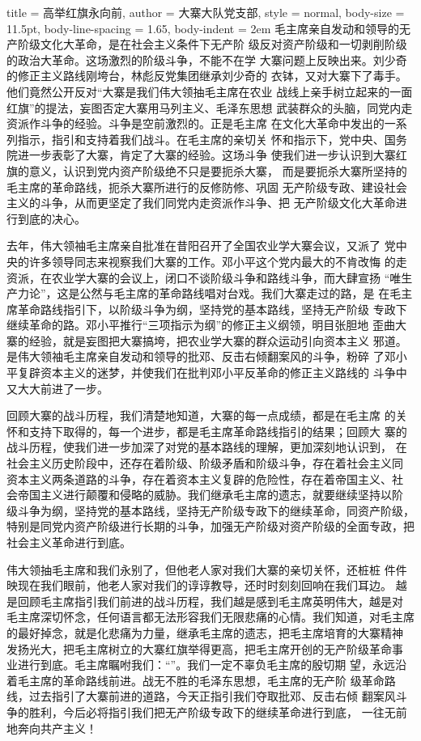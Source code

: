 \begin{hongqiarticle}{
        title  = {高举红旗永向前},
        author = {大寨大队党支部},
        style  = normal,
        body-size = 11.5pt,
        body-line-spacing = 1.65,
        body-indent = 2em
    }
    毛主席亲自发动和领导的无产阶级文化大革命，是在社会主义条件下无产阶
    级反对资产阶级和一切剥削阶级的政治大革命。这场激烈的阶级斗争，不能不在学
    大寨问题上反映出来。刘少奇的修正主义路线刚垮台，林彪反党集团继承刘少奇的
    衣钵，又对大寨下了毒手。他们竟然公开反对“大寨是我们伟大领抽毛主席在农业
    战线上亲手树立起来的一面红旗”的提法，妄图否定大寨用马列主义、毛泽东思想
    武装群众的头脑，同党内走资派作斗争的经验。斗争是空前激烈的。正是毛主席
    在文化大革命中发出的一系列指示，指引和支持着我们战斗。在毛主席的亲切关
    怀和指示下，党中央、国务院进一步表彰了大寨，肯定了大寨的经验。这场斗争
    使我们进一步认识到大寨红旗的意义，认识到党内资产阶级绝不只是要扼杀大寨，
    而是要扼杀大寨所坚持的毛主席的革命路线，扼杀大寨所进行的反修防修、巩固
    无产阶级专政、建设社会主义的斗争，从而更坚定了我们同党内走资派作斗争、把
    无产阶级文化大革命进行到底的决心。
    
    去年，伟大领袖毛主席亲自批准在昔阳召开了全国农业学大寨会议，又派了
    党中央的许多领导同志来视察我们大寨的工作。邓小平这个党内最大的不肯改悔
    的走资派，在农业学大寨的会议上，闭口不谈阶级斗争和路线斗争，而大肆宣扬
    “唯生产力论”，这是公然与毛主席的革命路线唱对台戏。我们大寨走过的路，是
    在毛主席革命路线指引下，以阶级斗争为纲，坚持党的基本路线，坚持无产阶级
    专政下继续革命的路。邓小平推行“三项指示为纲”的修正主义纲领，明目张胆地
    歪曲大寨的经验，就是妄图把大寨搞垮，把农业学大寨的群众运动引向资本主义
    邪道。是伟大领袖毛主席亲自发动和领导的批邓、反击右倾翻案风的斗争，粉碎
    了邓小平复辟资本主义的迷梦，并使我们在批判邓小平反革命的修正主义路线的
    斗争中又大大前进了一步。
    
    回顾大寨的战斗历程，我们清楚地知道，大寨的每一点成绩，都是在毛主席
    的关怀和支持下取得的，每一个进步，都是毛主席革命路线指引的结果；回顾大
    寨的战斗历程，使我们进一步加深了对党的基本路线的理解，更加深刻地认识到，
    在社会主义历史阶段中，还存在着阶级、阶级矛盾和阶级斗争，存在着社会主义同
    资本主义两条道路的斗争，存在着资本主义复辟的危险性，存在着帝国主义、社
    会帝国主义进行颠覆和侵略的威胁。我们继承毛主席的遗志，就要继续坚持以阶
    级斗争为纲，坚持党的基本路线，坚持无产阶级专政下的继续革命，同资产阶级，
    特别是同党内资产阶级进行长期的斗争，加强无产阶级对资产阶级的全面专政，把
    社会主义革命进行到底。
    
    伟大领抽毛主席和我们永别了，但他老人家对我们大寨的亲切关怀，还桩桩
    件件映现在我们眼前，他老人家对我们的谆谆教导，还时时刻刻回响在我们耳边。
    越是回顾毛主席指引我们前进的战斗历程，我们越是感到毛主席英明伟大，越是对
    毛主席深切怀念，任何语言都无法形容我们无限悲痛的心情。我们知道，对毛主席
    的最好掉念，就是化悲痛为力量，继承毛主席的遗志，把毛主席培育的大寨精神
    发扬光大，把毛主席树立的大寨红旗举得更高，把毛主席开创的无产阶级革命事
    业进行到底。毛主席瞩咐我们：“”。我们一定不辜负毛主席的殷切期
    望，永远沿着毛主席的革命路线前进。战无不胜的毛泽东思想，毛主席的无产阶
    级革命路线，过去指引了大寨前进的道路，今天正指引我们夺取批邓、反击右倾
    翻案风斗争的胜利，今后必将指引我们把无产阶级专政下的继续革命进行到底，
    一往无前地奔向共产主义！
\end{hongqiarticle}